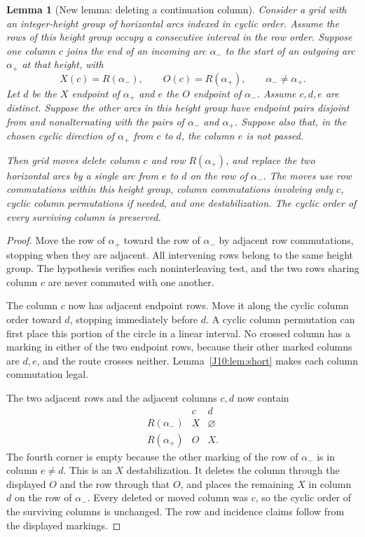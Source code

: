\documentclass[11pt,oneside]{report}
\newtheorem{lemma}[theorem]{Lemma}
\theoremstyle{definition}
\numberwithin{equation}{section}
\begin{document}
\begin{lemma}[New lemma: deleting a continuation column]
\label{J10:lem:continuation}
Consider a grid with an integer-height group of horizontal arcs indexed
in cyclic order. Assume the rows of this height group occupy a consecutive
interval in the row order. Suppose one column $c$ joins the end of an incoming
arc $\alpha_-$ to the start of an outgoing arc $\alpha_+$ at that
height, with
\[
 X(c)=R(\alpha_-),\qquad O(c)=R(\alpha_+),\qquad
 \alpha_-\ne\alpha_+.
\]
Let $d$ be the $X$ endpoint of $\alpha_+$ and $e$ the $O$ endpoint of
$\alpha_-$. Assume $c,d,e$ are distinct. Suppose the other arcs in
this height group have endpoint pairs disjoint from and nonalternating
with the pairs of $\alpha_-$ and $\alpha_+$.
Suppose also that, in the chosen cyclic direction of $\alpha_+$ from
$c$ to $d$, the column $e$ is not passed.

Then grid moves delete column $c$ and row $R(\alpha_+)$, and replace
the two horizontal arcs by a single arc from $e$ to $d$ on the row
of $\alpha_-$. The moves use row commutations within this height
group, column commutations involving only $c$, cyclic column
permutations if needed, and one destabilization. The cyclic order
of every surviving column is preserved.
\end{lemma}

\begin{proof}
Move the row of $\alpha_+$ toward the row of $\alpha_-$ by adjacent
row commutations, stopping when they are adjacent. All intervening
rows belong to the same height group. The hypothesis verifies each
noninterleaving test, and the two rows sharing column $c$ are never
commuted with one another.

The column $c$ now has adjacent endpoint rows. Move it along the
cyclic column order toward $d$, stopping immediately before $d$.
A cyclic column permutation can first place this portion of the
circle in a linear interval. No crossed column has a marking in either
of the two endpoint rows, because their other marked columns are
$d,e$, and the route crosses neither. Lemma~\ref{J10:lem:short} makes
each column commutation legal.

The two adjacent rows and the adjacent columns $c,d$ now contain
\[
\begin{array}{c|cc}
 &c&d\\ \hline
 R(\alpha_-)&X&\varnothing\\
 R(\alpha_+)&O&X.
\end{array}
\]
The fourth corner is empty because the other marking of the row of
$\alpha_-$ is in column $e\ne d$. This is an $X$ destabilization.
It deletes the column through the displayed $O$ and the row through
that $O$, and places the remaining $X$ in column $d$ on the row of
$\alpha_-$. Every deleted or moved column was $c$, so the cyclic
order of the surviving columns is unchanged. The row and incidence
claims follow from the displayed markings.
\end{proof}
\end{document}
